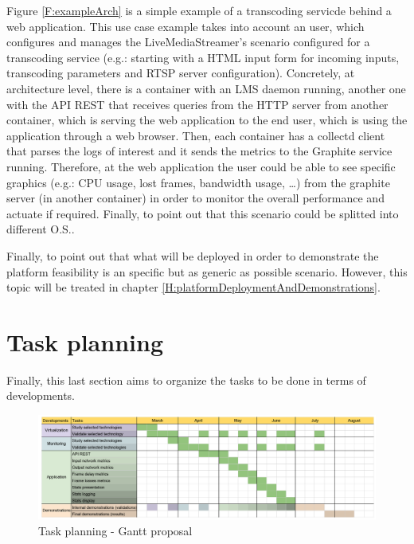Figure \ref{F:exampleArch} is a simple example of a transcoding servicde behind a web application. This use case example takes into account an user, which configures and manages the LiveMediaStreamer's scenario configured for a transcoding service (e.g.: starting with a HTML input form for incoming inputs, transcoding parameters and RTSP server configuration). Concretely, at architecture level, there is a container with an LMS daemon running, another one with the API REST that receives queries from the HTTP server from another container, which is serving the web application to the end user, which is using the application through a web browser. Then, each container has a collectd client that parses the logs of interest and it sends the metrics to the Graphite service running. Therefore, at the web application the user could be able to see specific graphics (e.g.: CPU usage, lost frames, bandwidth usage, \ldots) from the graphite server (in another container) in order to monitor the overall performance and actuate if required. Finally, to point out that this scenario could be splitted into different O.S.. 

Finally, to point out that what will be deployed in order to demonstrate the platform feasibility is an specific but as generic as possible scenario. However, this topic will be treated in chapter \ref{H:platformDeploymentAndDemonstrations}.


\section{Task planning}

Finally, this last section aims to organize the tasks to be done in terms of developments. 

\begin{figure}[!htb]
\begin{center}
\includegraphics[width=1\textwidth]{./images/gantt.png}
\caption{Task planning - Gantt proposal}
\label{F:tpgp}
\end{center}
\end{figure}

